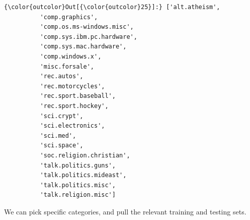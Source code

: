 \documentclass[11pt]{article}
\begin{document}
\begin{Verbatim}[commandchars=\\\{\}]
{\color{outcolor}Out[{\color{outcolor}25}]:} ['alt.atheism',
          'comp.graphics',
          'comp.os.ms-windows.misc',
          'comp.sys.ibm.pc.hardware',
          'comp.sys.mac.hardware',
          'comp.windows.x',
          'misc.forsale',
          'rec.autos',
          'rec.motorcycles',
          'rec.sport.baseball',
          'rec.sport.hockey',
          'sci.crypt',
          'sci.electronics',
          'sci.med',
          'sci.space',
          'soc.religion.christian',
          'talk.politics.guns',
          'talk.politics.mideast',
          'talk.politics.misc',
          'talk.religion.misc']
\end{Verbatim}
            
    We can pick specific categories, and pull the relevant training and
testing sets.
\end{document}
